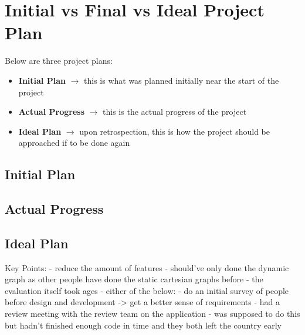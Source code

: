 \section{
    Initial vs Final vs Ideal Project Plan
} %
Below are three project plans:\begin{itemize}
    \item \textbf{Initial Plan} \(\to\) this is what was planned initially near the start of the project
    \item \textbf{Actual Progress} \(\to\) this is the actual progress of the project
    \item \textbf{Ideal Plan} \(\to\) upon retrospection, this is how the project should be approached if to be done again
\end{itemize}

\subsection{Initial Plan}

\subsection{Actual Progress}

\subsection{Ideal Plan}

Key Points:
- reduce the amount of features
    - should've only done the dynamic graph as other people have done the static cartesian graphs before
    - the evaluation itself took ages 
- either of the below:
    - do an initial survey of people before design and development -> get a better sense of requirements
    - had a review meeting with the review team on the application - was supposed to do this but hadn't finished enough code in time and they both left the country early